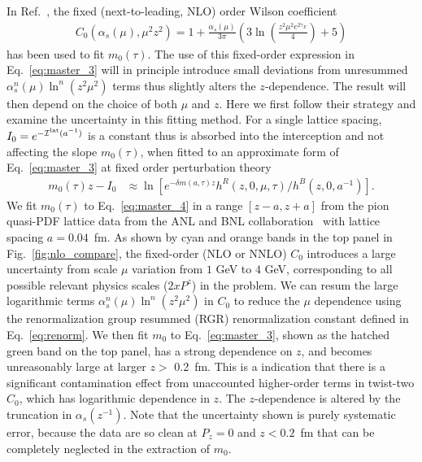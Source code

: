 \documentclass[prd,aps,nofootinbib,superscriptaddress,floatfix,preprintnumbers,twocolumn]{revtex4}
\begin{document}
 
In Ref.~\cite{LatticePartonCollaborationLPC:2021xdx}, the fixed (next-to-leading, NLO) order Wilson coefficient~\cite{Izubuchi:2018srq,Li:2020xml}
\begin{align}
    C_0(\alpha_s(\mu),\mu^2z^2)=1+\frac{\alpha_s(\mu)}{3\pi}\left(3\ln\left(\frac{z^2\mu^2e^{2\gamma_E}}{4}\right)+5\right)
\end{align}
has been used to fit $m_0(\tau)$. The use of this fixed-order expression in Eq.~\eqref{eq:master_3} will in principle introduce small deviations from unresummed $\alpha^n_s(\mu)\ln^n(z^2\mu^2)$ terms thus slightly alters the $z$-dependence. The result will then depend on the choice of both $\mu$ and $z$. 
Here we first follow their strategy and examine the uncertainty in this fitting method. For a single lattice spacing, $I_0=e^{-\mathcal{I}^{{\rm lat}}(a^{-1})}$ is a constant thus is absorbed into the interception and not affecting the slope $m_0(\tau)$, when fitted to an approximate form of Eq.~\eqref{eq:master_3} at fixed order perturbation theory
\begin{align}
\label{eq:master_4}
   m_0(\tau)z-I_0&\approx\ln\left[e^{-\delta m(a,\tau) z}h^R(z,0,\mu,\tau)/h^{B}(z,0,a^{-1})\right].
\end{align} 
We fit $m_0(\tau)$ to Eq.~\eqref{eq:master_4} in a range $[z-a,z+a]$ from the pion quasi-PDF lattice data from the ANL and BNL collaboration~\cite{Gao:2021dbh} with lattice spacing $a=0.04$~fm. 
As shown by cyan and orange bands in the top panel in Fig.~\ref{fig:nlo_compare}, the fixed-order (NLO or NNLO) $C_0$ introduces a large uncertainty from scale $\mu$ variation from $1$ GeV to $4$ GeV, corresponding to all possible relevant physics scales ($2xP^z$) in the problem. We can resum the large logarithmic terms $\alpha^n_s(\mu)\ln^n(z^2\mu^2)$ in $C_0$ to reduce the $\mu$ dependence using the renormalization group resummed (RGR) renormalization constant defined in Eq.~\eqref{eq:renorm}. We then fit $m_0$ to Eq.~\eqref{eq:master_3}, shown as the hatched green band on the top panel, has a strong dependence on $z$, and becomes unreasonably large at larger $z>$ 0.2~fm. This is a indication that there is a significant contamination effect from unaccounted higher-order terms in twist-two $C_0$, which has logarithmic dependence in $z$. The $z$-dependence is altered by the truncation in $\alpha_s(z^{-1})$. Note that the uncertainty shown is purely systematic error, because the data are so clean at $P_z=0$ and $z<0.2$~fm that can be completely neglected in the extraction of $m_0$.
\end{document}
